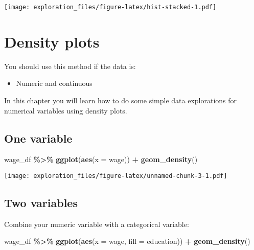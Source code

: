 \documentclass[
]{book}
\newenvironment{Shaded}{\begin{snugshade}}{\end{snugshade}}
\newcommand{\DataTypeTok}[1]{\textcolor[rgb]{0.13,0.29,0.53}{#1}}
\newcommand{\KeywordTok}[1]{\textcolor[rgb]{0.13,0.29,0.53}{\textbf{#1}}}
\newcommand{\NormalTok}[1]{#1}
\newcommand{\OperatorTok}[1]{\textcolor[rgb]{0.81,0.36,0.00}{\textbf{#1}}}
\newcommand{\StringTok}[1]{\textcolor[rgb]{0.31,0.60,0.02}{#1}}
\providecommand{\tightlist}{%
  \setlength{\itemsep}{0pt}\setlength{\parskip}{0pt}}
\begin{document}
\texttt{[image: exploration\_files/figure-latex/hist-stacked-1.pdf]}

\hypertarget{density}{%
\chapter{Density plots}\label{density}}

You should use this method if the data is:

\begin{itemize}
\tightlist
\item
  Numeric and continuous
\end{itemize}

In this chapter you will learn how to do some simple data explorations for numerical variables using density plots.

\hypertarget{one-variable-2}{%
\section{One variable}\label{one-variable-2}}

\begin{Shaded}
\begin{Highlighting}[]
\NormalTok{wage\_df }\OperatorTok{\%\textgreater{}\%}\StringTok{ }
\StringTok{  }\KeywordTok{ggplot}\NormalTok{(}\KeywordTok{aes}\NormalTok{(}\DataTypeTok{x =}\NormalTok{ wage)) }\OperatorTok{+}
\StringTok{  }\KeywordTok{geom\_density}\NormalTok{()}
\end{Highlighting}
\end{Shaded}

\texttt{[image: exploration\_files/figure-latex/unnamed-chunk-3-1.pdf]}

\hypertarget{two-variables-2}{%
\section{Two variables}\label{two-variables-2}}

Combine your numeric variable with a categorical variable:

\begin{Shaded}
\begin{Highlighting}[]
\NormalTok{wage\_df }\OperatorTok{\%\textgreater{}\%}\StringTok{ }
\StringTok{  }\KeywordTok{ggplot}\NormalTok{(}\KeywordTok{aes}\NormalTok{(}\DataTypeTok{x =}\NormalTok{ wage, }\DataTypeTok{fill =}\NormalTok{ education)) }\OperatorTok{+}\StringTok{ }
\StringTok{  }\KeywordTok{geom\_density}\NormalTok{() }
\end{Highlighting}
\end{Shaded}
\end{document}
